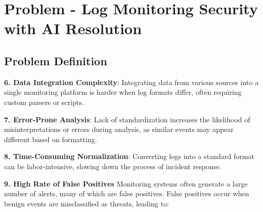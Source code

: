 \chapter{Problem - Log Monitoring Security with AI Resolution} 
\label{chap:problem}



\section{Problem Definition}




















\textbf{6. Data Integration Complexity}: Integrating data from various sources into a single monitoring platform is harder when log formats differ, often requiring custom parsers or scripts.



\textbf{7. Error-Prone Analysis}: Lack of standardization increases the likelihood of misinterpretations or errors during analysis, as similar events may appear different based on formatting.



\textbf{8. Time-Consuming Normalization}: Converting logs into a standard format can be labor-intensive, slowing down the process of incident response.



\textbf{9. High Rate of False Positives}
Monitoring systems often generate a large number of alerts, many of which are false positives. False positives occur when benign events are misclassified as threats, leading to:


